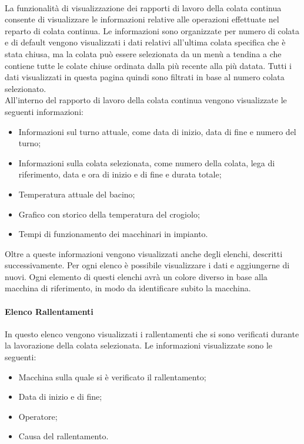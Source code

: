   \paragraph{}
  La funzionalità di visualizzazione dei rapporti di lavoro della colata continua consente di visualizzare 
  le informazioni relative alle operazioni effettuate nel reparto di colata continua. Le informazioni sono 
  organizzate per numero di colata e di default vengono visualizzati i dati relativi all'ultima colata specifica che è 
  stata chiusa, ma la colata può essere selezionata da un menù a tendina a che contiene tutte le colate chiuse ordinata 
  dalla più recente alla più datata. Tutti i dati visualizzati in questa pagina quindi sono filtrati in base al numero colata selezionato.\\
  All’interno del rapporto di lavoro della colata continua vengono visualizzate le seguenti informazioni:
  \begin{itemize}
    \item Informazioni sul turno attuale, come data di inizio, data di fine e numero del turno;
    \item Informazioni sulla colata selezionata, come numero della colata, lega di riferimento, data e ora 
    di inizio e di fine e durata totale;
    \item Temperatura attuale del bacino;
    \item Grafico con storico della temperatura del crogiolo;
    \item Tempi di funzionamento dei macchinari in impianto.
  \end{itemize}
  Oltre a queste informazioni vengono visualizzati anche degli elenchi, descritti successivamente. 
  Per ogni elenco è possibile visualizzare i dati e aggiungerne di nuovi. Ogni elemento di questi elenchi 
  avrà un colore diverso in base alla macchina di riferimento, in modo da identificare subito la macchina.
  
  \paragraph{Elenco Rallentamenti}
  In questo elenco vengono visualizzati i rallentamenti che si sono verificati durante la lavorazione della colata 
  selezionata. Le informazioni visualizzate sono le seguenti:
  \begin{itemize}
    \item Macchina sulla quale si è verificato il rallentamento;
    \item Data di inizio e di fine;
    \item Operatore;
    \item Causa del rallentamento.
  \end{itemize} 

